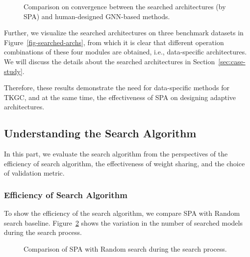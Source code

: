 \documentclass[11pt]{article}
\begin{document}
\begin{figure}[!ht]
	\vspace{-10px}
\caption{Comparison on convergence between the searched architectures (by SPA) and human-designed GNN-based methods.} 
	\label{fig-learning_curve}
	\vspace{-10px}
\end{figure}
Further, 
we visualize the searched architectures on three benchmark datasets in Figure~\ref{fig-searched-archs}, 
from which it is clear that different operation combinations of these four modules 
are obtained, 
i.e., data-specific architectures.
We will discuss the details about the searched architectures in Section~\ref{sec:case-study}.

Therefore, 
these results demonstrate the need for data-specific methods for TKGC, 
and at the same time, 
the effectiveness of SPA on designing adaptive architectures.

\subsection{Understanding the Search Algorithm}

In this part,
we evaluate the search algorithm from the perspectives of the efficiency of search algorithm, 
the effectiveness of weight sharing, 
and the choice of validation metric. 

\subsubsection{Efficiency of Search Algorithm}

To show the efficiency of the search algorithm,
we compare SPA with Random search baseline.
Figure~\ref{fig-search_time} shows the variation in the number of searched models during the search process.

\begin{figure}[h]
	\vspace{-10px}
\caption{Comparison of SPA with Random search during the search process.} 
	\label{fig-search_time}
	\vspace{-10px}
\end{figure}
\end{document}
